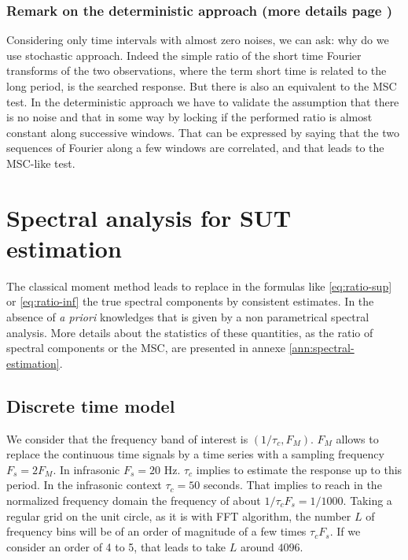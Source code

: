 \subsubsection{Remark on the deterministic approach (more details page \pageref{ann:deterministic-approach})}
Considering only time intervals with almost zero noises, we can ask: why do we use stochastic approach. Indeed the simple ratio of the short time Fourier transforms of the two observations, where the term short time is related to the long period, is the searched response. But there is also an equivalent to the MSC test. In the deterministic approach we have to validate the assumption that there is no noise and that in some way by locking if the performed ratio is almost constant along successive windows. That can be expressed by saying that the two sequences of Fourier along a few windows are correlated, and that leads to the MSC-like test.

\section{Spectral analysis for SUT estimation}
The classical moment method leads to replace in the  formulas like \eqref{eq:ratio-sup}  or \eqref{eq:ratio-inf} the true spectral components by consistent estimates. In the absence of {\it a priori} knowledges that is given by a non parametrical spectral analysis. More details about the statistics of these quantities, as  the ratio of spectral components or the MSC, are presented in annexe \ref{ann:spectral-estimation}. 


\subsection{Discrete time model}
We consider that the frequency band of interest is $(1/\tau_{c}, F_{M})$. $F_{M}$ allows to replace the continuous time signals by a time series with a sampling frequency $F_{s}=2F_{M}$. In infrasonic $F_{s}=20$ Hz. $\tau_{c}$ implies to estimate the response up to this period. In the infrasonic context $\tau_{c}=50$ seconds. That implies to reach in the normalized frequency domain the frequency of about $1/\tau_{c}F_{s}=1/1000$. Taking a regular grid on the unit circle, as it is with FFT algorithm, the number $L$ of frequency bins will be of an order of magnitude of a few times $\tau_{c}F_{s}$. If we consider an order of 4 to 5, that leads to take $L$ around $4096$.


